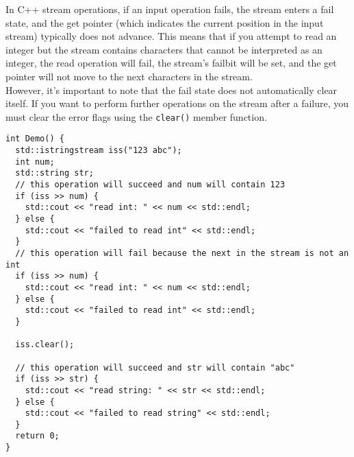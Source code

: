 In C++ stream operations, if an input operation fails, the stream enters a fail state, and the get pointer (which indicates the current position in the input stream) typically does not advance. This means that if you attempt to read an integer but the stream contains characters that cannot be interpreted as an integer, the read operation will fail, the stream's failbit will be set, and the get pointer will not move to the next characters in the stream.\\

However, it's important to note that the fail state does not automatically clear itself. If you want to perform further operations on the stream after a failure, you must clear the error flags using the {\colorbox{CodeBackground}{\lstinline|clear()|}} member function.

\begin{lstlisting}
int Demo() {
  std::istringstream iss("123 abc");
  int num;
  std::string str;
  // this operation will succeed and num will contain 123
  if (iss >> num) {
    std::cout << "read int: " << num << std::endl;
  } else {
    std::cout << "failed to read int" << std::endl;
  }
  // this operation will fail because the next in the stream is not an int
  if (iss >> num) {
    std::cout << "read int: " << num << std::endl;
  } else {
    std::cout << "failed to read int" << std::endl;
  }

  iss.clear();

  // this operation will succeed and str will contain "abc"
  if (iss >> str) {
    std::cout << "read string: " << str << std::endl;
  } else {
    std::cout << "failed to read string" << std::endl;
  }
  return 0;
}
\end{lstlisting}